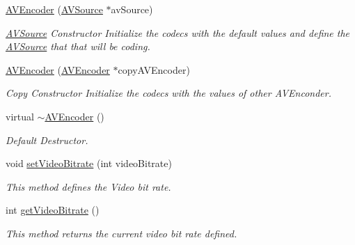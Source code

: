 \begin{DoxyCompactItemize}
\item 
\hyperlink{classbr_1_1ufscar_1_1lince_1_1xpta_1_1streaming_1_1AVEncoder_a1d1534f7205efbc155a7c4f85a2c6c7b}{AVEncoder} (\hyperlink{classbr_1_1ufscar_1_1lince_1_1xpta_1_1streaming_1_1AVSource}{AVSource} $\ast$avSource)
\begin{DoxyCompactList}\small\item\em \hyperlink{classbr_1_1ufscar_1_1lince_1_1xpta_1_1streaming_1_1AVSource}{AVSource} Constructor Initialize the codecs with the default values and define the \hyperlink{classbr_1_1ufscar_1_1lince_1_1xpta_1_1streaming_1_1AVSource}{AVSource} that that will be coding. \item\end{DoxyCompactList}\item 
\hyperlink{classbr_1_1ufscar_1_1lince_1_1xpta_1_1streaming_1_1AVEncoder_a7d4521d46902758f1354421233c45678}{AVEncoder} (\hyperlink{classbr_1_1ufscar_1_1lince_1_1xpta_1_1streaming_1_1AVEncoder}{AVEncoder} $\ast$copyAVEncoder)
\begin{DoxyCompactList}\small\item\em Copy Constructor Initialize the codecs with the values of other AVEnconder. \item\end{DoxyCompactList}\item 
virtual \hyperlink{classbr_1_1ufscar_1_1lince_1_1xpta_1_1streaming_1_1AVEncoder_a52c01ec40955a064cfdcb053080d7388}{$\sim$AVEncoder} ()
\begin{DoxyCompactList}\small\item\em Default Destructor. \item\end{DoxyCompactList}\item 
void \hyperlink{classbr_1_1ufscar_1_1lince_1_1xpta_1_1streaming_1_1AVEncoder_ab39d36dc72ceb6663da453afcfad5d0e}{setVideoBitrate} (int videoBitrate)
\begin{DoxyCompactList}\small\item\em This method defines the Video bit rate. \item\end{DoxyCompactList}\item 
int \hyperlink{classbr_1_1ufscar_1_1lince_1_1xpta_1_1streaming_1_1AVEncoder_ad59e0ed12e65047454d4f6031ade8a19}{getVideoBitrate} ()
\begin{DoxyCompactList}\small\item\em This method returns the current video bit rate defined. \item\end{DoxyCompactList}\item 

\end{DoxyCompactItemize}
